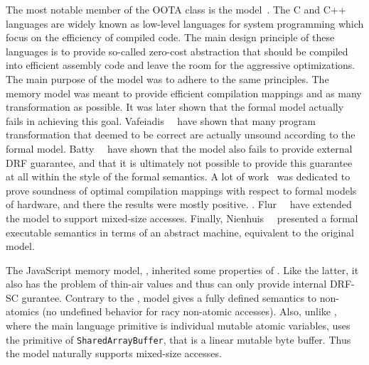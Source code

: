 The most notable member of the OOTA class is the \CMM model~\cite{Batty-al:POPL11}.
The C and C++ languages are widely known as low-level languages 
for system programming which focus on the efficiency of compiled code. 
The main design principle of these languages is to provide
so-called zero-cost abstraction that should be compiled 
into efficient assembly code and leave the room 
for the aggressive optimizations. 
The main purpose of the \CMM model was to adhere 
to the same principles. The memory model 
was meant to provide efficient compilation mappings 
and as many transformation as possible.
It was later shown that the formal model actually 
fails in achieving this goal. 
Vafeiadis~\etal~\cite{Vafeiadis-al:POPL15} have shown
that many program transformation that deemed to be correct
are actually unsound according to the formal model. 
Batty~\etal~\cite{Batty-al:ESOP15} have shown that 
the model also fails to provide external DRF guarantee, 
and that it is ultimately not possible to provide this guarantee
at all within the style of the \CMM formal semantics.
A lot of work~\cite{Batty-al:POPL11, Sarkar-al:PLDI12, Batty-al:POPL12, Batty-al:POPL16} 
was dedicated to prove soundness of optimal compilation mappings 
with respect to formal models of hardware, 
and there the results were mostly positive.
. 
Flur~\etal~\cite{Flur-al:POPL17} have extended the model 
to support mixed-size accesses.
Finally, Nienhuis~\etal~\cite{Nienhuis-al:OOPSLA16} presented 
a formal executable semantics in terms of an abstract machine, 
equivalent to the original \CMM model. 

The JavaScript memory model, \JSMM, inherited  some properties of \CMM.
Like the latter, it also has the problem of thin-air values
and thus can only provide internal DRF-SC gurantee. 
Contrary to the \CMM, \JS model gives a fully defined 
semantics to non-atomics 
(\ie no undefined behavior for racy non-atomic accesses).  
Also, unlike \CMM, where the main language primitive is 
individual mutable atomic variables, \JSMM uses 
the primitive of \texttt{SharedArrayBuffer},
that is a linear mutable byte buffer.
Thus the model naturally supports mixed-size accesses.


